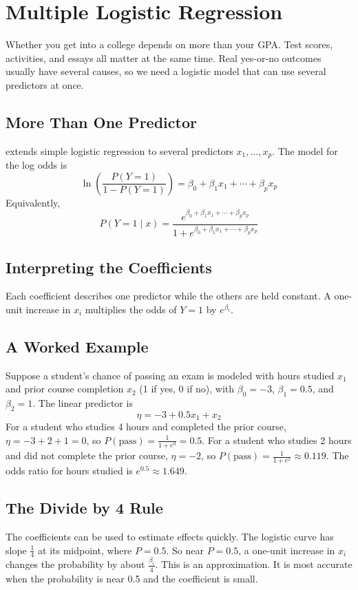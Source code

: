 \chapter{Multiple Logistic Regression}

Whether you get into a college depends on more than your GPA. Test scores,
activities, and essays all matter at the same time. Real yes-or-no outcomes
usually have several causes, so we need a logistic model that can use several
predictors at once.

\section{More Than One Predictor}
 extends simple logistic regression to several predictors
$x_1, \ldots, x_p$. The model for the log odds is
$$\ln\left(\frac{P(Y = 1)}{1 - P(Y = 1)}\right) = \beta_0 + \beta_1 x_1 + \cdots + \beta_p x_p$$
Equivalently,
$$P(Y = 1 \mid x) = \frac{e^{\beta_0 + \beta_1 x_1 + \cdots + \beta_p x_p}}{1 + e^{\beta_0 + \beta_1 x_1 + \cdots + \beta_p x_p}}$$

\section{Interpreting the Coefficients}
Each coefficient describes one predictor while the others are held constant. A one-unit increase in $x_i$
multiplies the odds of $Y = 1$ by $e^{\beta_i}$.

\section{A Worked Example}
Suppose a student's chance of passing an exam is modeled with hours studied $x_1$ and prior course
completion $x_2$ (1 if yes, 0 if no), with $\beta_0 = -3$, $\beta_1 = 0.5$, and $\beta_2 = 1$. The linear predictor is
$$\eta = -3 + 0.5 x_1 + x_2$$
For a student who studies 4 hours and completed the prior course, $\eta = -3 + 2 + 1 = 0$, so
$P(\text{pass}) = \frac{1}{1 + e^0} = 0.5$. For a student who studies 2 hours and did not complete the
prior course, $\eta = -2$, so $P(\text{pass}) = \frac{1}{1 + e^{2}} \approx 0.119$. The odds ratio for
hours studied is $e^{0.5} \approx 1.649$.

\section{The Divide by 4 Rule}
The coefficients can be used to estimate effects quickly. The logistic curve has slope $\frac{1}{4}$ at its midpoint,
where $P = 0.5$. So near $P = 0.5$, a one-unit increase in $x_i$ changes the probability by about $\frac{\beta_i}{4}$.
This is an approximation. It is most accurate when the probability is near 0.5 and the coefficient is small.

